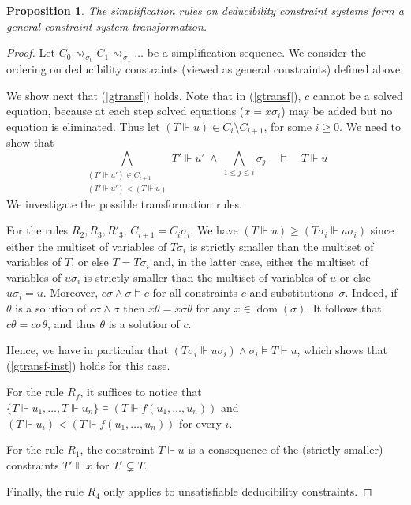 \documentclass[acmtocl,acmnow]{acmtrans2m}
\newtheorem{proposition}[theorem]{Proposition}
\newcommand{\dom}{\operatorname{dom}}
\newcommand{\dedconss}[1]{deducibility constraints}
\newcommand{\dedsyss}[1]{deducibility constraint systems}
\begin{document}
\begin{proposition}\label{prop-isgtransf}
  The simplification rules on \dedsyss{} form a general constraint
  system transformation.
\end{proposition}
\begin{proof}
  Let $C_0\rightsquigarrow_{\sigma_0} C_1 \rightsquigarrow_{\sigma_1}
  \dots$ be a simplification sequence.  We consider the ordering on
  \dedconss{} (viewed as general constraints) defined above.

  We show next that (\ref{gtransf}) holds.  Note that in
  (\ref{gtransf}), $c$ cannot be a solved equation, because at each
  step solved equations ($x=x\sigma_i$) may be added but no equation
  is eliminated.
Thus let $(T\Vdash u)\in C_{i}\setminus C_{i+1}$, for some $i\ge 0$.
  We need to show that 
\begin{equation}\label{gtransf-inst}
  \bigwedge_{\substack{(T'\Vdash u')\in C_{i+1}\\(T'\Vdash u') <
      (T\Vdash u)}} T'\Vdash u'\ \wedge\ \bigwedge_{1\le
    j\le i}\sigma_j\quad \models \quad T\Vdash u
\end{equation}
We investigate the possible transformation rules.

  For the rules $R_2,R_3,R'_3$, $C_{i+1}=C_i\sigma_i$. We have
  $(T\Vdash u) \geq (T\sigma_i\Vdash u\sigma_i)$ since either the
  multiset of variables of $T\sigma_i$ is strictly smaller than the
  multiset of variables of $T$, or else $T=T\sigma_i$ and, in the
  latter case, either the multiset of variables of $u\sigma_i$ is
  strictly smaller than the multiset of variables of $u$ or else
  $u\sigma_i=u$.  Moreover, $c\sigma \wedge \sigma \models c$ for all
  constraints $c$ and substitutions~$\sigma$.
Indeed, if $\theta$ is a solution of $c\sigma \wedge \sigma$ then
  $x\theta=x\sigma\theta$ for any $x\in\dom(\sigma)$. It follows that
  $c\theta=c\sigma\theta$, and thus $\theta$ is a solution of $c$.


  Hence, we have in particular that $(T\sigma_i\Vdash u\sigma_i)\wedge
  \sigma_i\models T\vdash u$, which shows that (\ref{gtransf-inst})
  holds for this case.

  For the rule $R_f$, it suffices to notice that $\{T\Vdash
  u_1,\ldots, T\Vdash u_n\} \models (T\Vdash f(u_1,\ldots,u_n))$ and
  $(T\Vdash u_i) < (T\Vdash f(u_1,\ldots,u_n))$ for every $i$.

For the rule $R_1$, the constraint $T\Vdash u$ is a consequence of the
(strictly smaller) constraints $T' \Vdash x$ for $T'\subsetneq T$. 

Finally, the rule $R_4$ only applies to unsatisfiable \dedconss{}.
\end{proof}
\end{document}
